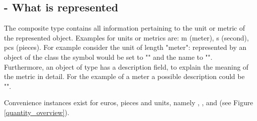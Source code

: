 \subsection{ - What is represented}
The composite type  contains all information pertaining to the unit or metric of the represented object.
Examples for units or metrics are: m (meter), s (second), pcs (pieces).
For example consider the unit of length "meter": represented by an object of the class  the symbol would be set to "" and the name to "".
Furthermore, an object of type  has a description field, to explain the meaning of the metric in detail.
For the example of a meter a possible description could be "".

Convenience instances exist for euros, pieces and units, namely , , and  (see Figure \ref{quantity_overview}).



